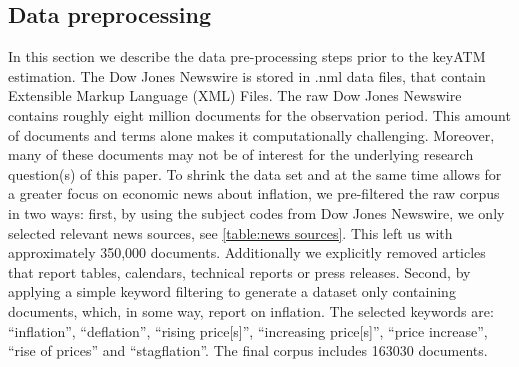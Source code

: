 \newpage







\subsection{Data preprocessing}\label{subsec:DataPrep}

In this section we describe the data pre-processing steps prior to the keyATM estimation.
The Dow Jones Newswire is stored in .nml data files, that contain Extensible Markup Language (XML) Files. The raw Dow Jones Newswire contains roughly eight million documents for the observation period. This amount of documents and terms alone makes it computationally challenging. Moreover, many of these documents may not be of interest for the underlying research question(s) of this paper. To shrink the data set and at the same time allows for a greater focus on economic news about inflation, we pre-filtered the raw corpus in two ways: first, by using the subject codes from Dow Jones Newswire, we only selected relevant news sources, see \ref{table:news sources}. This left us with approximately 350,000 documents. Additionally we explicitly removed articles that report tables, calendars, technical reports or press releases. Second, by applying a simple keyword filtering to generate a dataset only containing documents, which, in some way, report on inflation. The selected keywords are:  ``inflation'', ``deflation'', ``rising price[s]'', ``increasing price[s]'', ``price increase'', ``rise of prices'' and ``stagflation''. The final corpus includes 163030 documents. 


